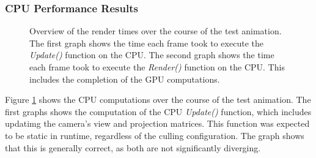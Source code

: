 \subsubsection*{CPU Performance Results} \label{subsubsec-cpu-performance-results-lucy}

\begin{figure}[!htb]              %
  \begin{center}
    \caption{Overview of the render times over the course of the test animation. The first graph shows the time 
    each frame took to execute the \emph{Update()} function on the \ac{CPU}. The second graph shows the time each 
    frame took to execute the \emph{Render()} function on the \ac{CPU}. This includes the completion of the 
    \ac{GPU} computations.}
    \label{plt:lucy-256-culling-cpu-time}
  \end{center}
\end{figure}

\noindent
Figure \ref{plt:lucy-256-culling-cpu-time} shows the \ac{CPU} computations over the course of the test animation.
The first graphs shows the computation of the \ac{CPU} \emph{Update()} function, which includes updatimg the camera's 
view and projection matrices. This function was expected to be static in runtime, regardless of the culling configuration. 
The graph shows that this is generally correct, as both are not significantly diverging.\\

